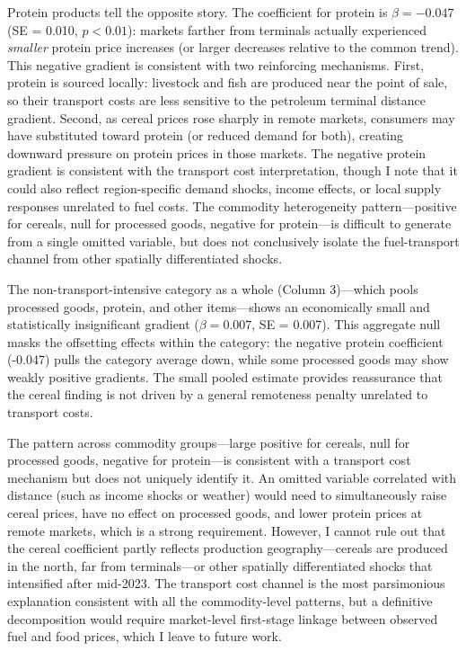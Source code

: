 \documentclass[12pt]{article}
\begin{document}
Protein products tell the opposite story. The coefficient for protein is $\beta = -0.047$ (SE = 0.010, $p < 0.01$): markets farther from terminals actually experienced \textit{smaller} protein price increases (or larger decreases relative to the common trend). This negative gradient is consistent with two reinforcing mechanisms. First, protein is sourced locally: livestock and fish are produced near the point of sale, so their transport costs are less sensitive to the petroleum terminal distance gradient. Second, as cereal prices rose sharply in remote markets, consumers may have substituted toward protein (or reduced demand for both), creating downward pressure on protein prices in those markets. The negative protein gradient is consistent with the transport cost interpretation, though I note that it could also reflect region-specific demand shocks, income effects, or local supply responses unrelated to fuel costs. The commodity heterogeneity pattern---positive for cereals, null for processed goods, negative for protein---is difficult to generate from a single omitted variable, but does not conclusively isolate the fuel-transport channel from other spatially differentiated shocks.

The non-transport-intensive category as a whole (Column 3)---which pools processed goods, protein, and other items---shows an economically small and statistically insignificant gradient ($\beta = 0.007$, SE = 0.007). This aggregate null masks the offsetting effects within the category: the negative protein coefficient (-0.047) pulls the category average down, while some processed goods may show weakly positive gradients. The small pooled estimate provides reassurance that the cereal finding is not driven by a general remoteness penalty unrelated to transport costs.

The pattern across commodity groups---large positive for cereals, null for processed goods, negative for protein---is consistent with a transport cost mechanism but does not uniquely identify it. An omitted variable correlated with distance (such as income shocks or weather) would need to simultaneously raise cereal prices, have no effect on processed goods, and lower protein prices at remote markets, which is a strong requirement. However, I cannot rule out that the cereal coefficient partly reflects production geography---cereals are produced in the north, far from terminals---or other spatially differentiated shocks that intensified after mid-2023. The transport cost channel is the most parsimonious explanation consistent with all the commodity-level patterns, but a definitive decomposition would require market-level first-stage linkage between observed fuel and food prices, which I leave to future work.
\end{document}
